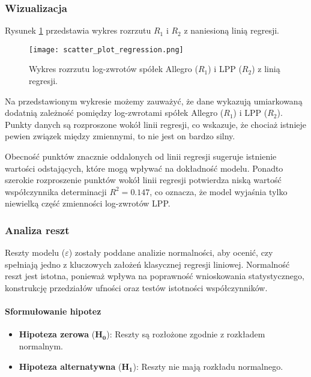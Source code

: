 \documentclass[12pt]{article}
\begin{document}
\subsubsection{Wizualizacja}
Rysunek \ref{fig:scatter_plot_regression} przedstawia wykres rozrzutu \(R_1\) i \(R_2\) z naniesioną linią regresji.

\begin{figure}[H]
    \centering
    \texttt{[image: scatter\_plot\_regression.png]}
    \caption{Wykres rozrzutu log-zwrotów spółek Allegro (\(R_1\)) i LPP (\(R_2\)) z linią regresji.}
    \label{fig:scatter_plot_regression}
\end{figure}

Na przedstawionym wykresie możemy zauważyć, że dane wykazują umiarkowaną dodatnią zależność pomiędzy log-zwrotami spółek Allegro (\(R_1\)) i LPP (\(R_2\)). Punkty danych są rozproszone wokół linii regresji, co wskazuje, że chociaż istnieje pewien związek między zmiennymi, to nie jest on bardzo silny.

Obecność punktów znacznie oddalonych od linii regresji sugeruje istnienie wartości odstających, które mogą wpływać na dokładność modelu. Ponadto szerokie rozproszenie punktów wokół linii regresji potwierdza niską wartość współczynnika determinacji \(R^2 = 0.147\), co oznacza, że model wyjaśnia tylko niewielką część zmienności log-zwrotów LPP.

\subsubsection{Analiza reszt}

Reszty modelu (\(\varepsilon\)) zostały poddane analizie normalności, aby ocenić, czy spełniają jedno z kluczowych założeń klasycznej regresji liniowej. Normalność reszt jest istotna, ponieważ wpływa na poprawność wnioskowania statystycznego, konstrukcję przedziałów ufności oraz testów istotności współczynników.

\paragraph{Sformułowanie hipotez}
\begin{itemize}
    \item \textbf{Hipoteza zerowa} (\(\mathbf{H_0}\)): Reszty są rozłożone zgodnie z rozkładem normalnym.
    \item \textbf{Hipoteza alternatywna} (\(\mathbf{H_1}\)): Reszty nie mają rozkładu normalnego.
\end{itemize}
\end{document}
